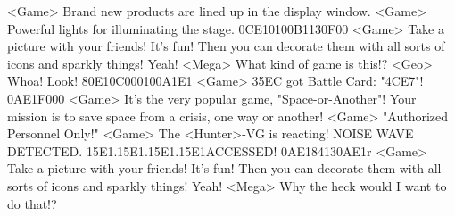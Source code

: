 <Game> Brand new products are lined up in the display window. 
<Game> Powerful lights for illuminating the stage. 
{0C}{E1}{01}{00}{B1}{13}{0F}{00}
<Game> Take a picture with your friends! It's fun! 
Then you can decorate them with all sorts of icons and sparkly things! Yeah! 
<Mega> What kind of game is this!? 
<Geo> Whoa! Look! 
{80}{E1}{0C}{00}{01}{00}{A1}{E1} 
<Game> {35}{EC} got Battle Card: "{4C}{E7}"! 
{0A}{E1}{F0}{00}
<Game> It's the very popular game, "Space-or-Another"! 
Your mission is to save space from a crisis, one way or another! 
<Game> "Authorized Personnel Only!" 
<Game> The <Hunter>-VG is reacting! 
NOISE WAVE DETECTED. {15}{E1}.{15}{E1}.{15}{E1}.{15}{E1}ACCESSED! 
{0A}{E1}{84}{13}{0A}{E1}r
<Game> Take a picture with your friends! It's fun! 
Then you can decorate them with all sorts of icons and sparkly things! Yeah! 
<Mega> Why the heck would I want to do that!? 
